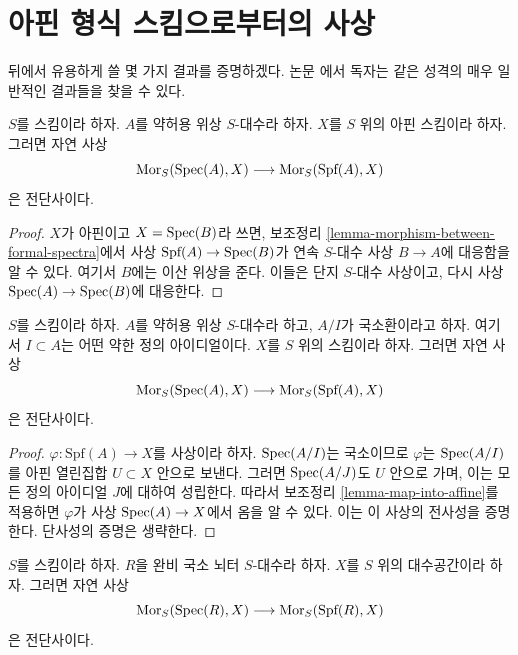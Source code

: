 \section{아핀 형식 스킴으로부터의 사상}
\label{section-map-out-of}

\noindent
뒤에서 유용하게 쓸 몇 가지 결과를 증명하겠다.
논문 \cite{Bhatt-Algebraize}에서 독자는 같은 성격의 매우 일반적인
결과들을 찾을 수 있다.

\begin{lemma}
\label{lemma-map-into-affine}
$S$를 스킴이라 하자. $A$를 약허용 위상 $S$-대수라 하자.
$X$를 $S$ 위의 아핀 스킴이라 하자. 그러면 자연 사상
$$
\mathop{\mathrm{Mor}}\nolimits_S(\mathop{\mathrm{Spec}}(A), X)
\longrightarrow
\mathop{\mathrm{Mor}}\nolimits_S(\text{Spf}(A), X)
$$
은 전단사이다.
\end{lemma}

\begin{proof}
$X$가 아핀이고 $X = \mathop{\mathrm{Spec}}(B)$라 쓰면, 보조정리
\ref{lemma-morphism-between-formal-spectra}에서 사상
$\text{Spf}(A) \to \mathop{\mathrm{Spec}}(B)$가 연속 $S$-대수 사상
$B \to A$에 대응함을 알 수 있다. 여기서 $B$에는 이산 위상을 준다.
이들은 단지 $S$-대수 사상이고, 다시 사상
$\mathop{\mathrm{Spec}}(A) \to \mathop{\mathrm{Spec}}(B)$에 대응한다.
\end{proof}

\begin{lemma}
\label{lemma-map-into-scheme}
$S$를 스킴이라 하자. $A$를 약허용 위상 $S$-대수라 하고, $A/I$가
국소환이라고 하자. 여기서 $I \subset A$는 어떤 약한 정의 아이디얼이다.
$X$를 $S$ 위의 스킴이라 하자. 그러면 자연 사상
$$
\mathop{\mathrm{Mor}}\nolimits_S(\mathop{\mathrm{Spec}}(A), X)
\longrightarrow
\mathop{\mathrm{Mor}}\nolimits_S(\text{Spf}(A), X)
$$
은 전단사이다.
\end{lemma}

\begin{proof}
$\varphi : \text{Spf}(A) \to X$를 사상이라 하자. $\mathop{\mathrm{Spec}}(A/I)$는
국소이므로 $\varphi$는 $\mathop{\mathrm{Spec}}(A/I)$를 아핀 열린집합
$U \subset X$ 안으로 보낸다. 그러면 $\mathop{\mathrm{Spec}}(A/J)$도 $U$ 안으로 가며,
이는 모든 정의 아이디얼 $J$에 대하여 성립한다. 따라서 보조정리
\ref{lemma-map-into-affine}를 적용하면 $\varphi$가 사상
$\mathop{\mathrm{Spec}}(A) \to X$에서 옴을 알 수 있다. 이는 이 사상의 전사성을 증명한다.
단사성의 증명은 생략한다.
\end{proof}

\begin{lemma}
\label{lemma-map-into-algebraic-space}
$S$를 스킴이라 하자. $R$을 완비 국소 뇌터 $S$-대수라 하자.
$X$를 $S$ 위의 대수공간이라 하자. 그러면 자연 사상
$$
\mathop{\mathrm{Mor}}\nolimits_S(\mathop{\mathrm{Spec}}(R), X)
\longrightarrow
\mathop{\mathrm{Mor}}\nolimits_S(\text{Spf}(R), X)
$$
은 전단사이다.
\end{lemma}

